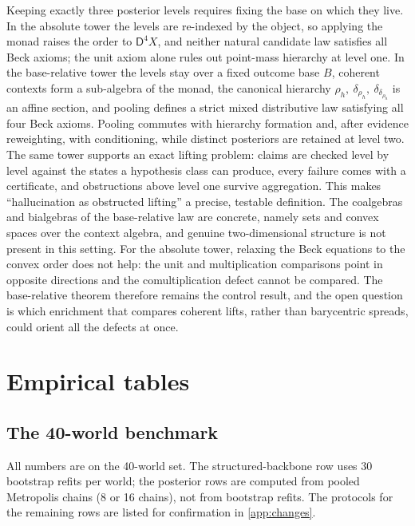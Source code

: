\documentclass[11pt]{article}
\theoremstyle{definition}
\theoremstyle{remark}
\newcommand{\D}{\mathsf{D}}
\begin{document}
Keeping exactly three posterior levels requires fixing the base on which they live. In the
absolute tower the levels are re-indexed by the object, so applying the monad raises the order to
$\D^4X$, and neither natural candidate law satisfies all Beck axioms; the unit axiom alone rules out
point-mass hierarchy at level one. In the base-relative tower the levels stay over a fixed outcome
base $B$, coherent contexts form a sub-algebra of the monad, the canonical hierarchy
$\rho_h,\ \delta_{\rho_h},\ \delta_{\delta_{\rho_h}}$ is an affine section, and pooling defines a strict
mixed distributive law satisfying all four Beck axioms. Pooling commutes with hierarchy formation and, after evidence reweighting, with conditioning,
while distinct posteriors are retained at level two. The same tower supports an exact lifting
problem: claims are checked level by level against the states a hypothesis class can produce, every
failure comes with a certificate, and obstructions above level one survive aggregation. This makes
``hallucination as obstructed lifting'' a precise, testable definition. The coalgebras and
bialgebras of the base-relative law are concrete, namely sets and convex spaces over the context
algebra, and genuine two-dimensional structure is not present in this setting. For the absolute
tower, relaxing the Beck equations to the convex order does not help: the unit and multiplication
comparisons point in opposite directions and the comultiplication defect cannot be compared. The
base-relative theorem therefore remains the control result, and the open question is which enrichment
that compares coherent lifts, rather than barycentric spreads, could orient all the defects at once.

\appendix

\section{Empirical tables}\label{app:empirical}

\subsection{The 40-world benchmark}
All numbers are on the 40-world set. The structured-backbone row uses 30 bootstrap refits per
world; the posterior rows are computed from pooled Metropolis chains (8 or 16 chains), not from
bootstrap refits. The protocols for the remaining rows are listed for confirmation in
\cref{app:changes}.
\end{document}
